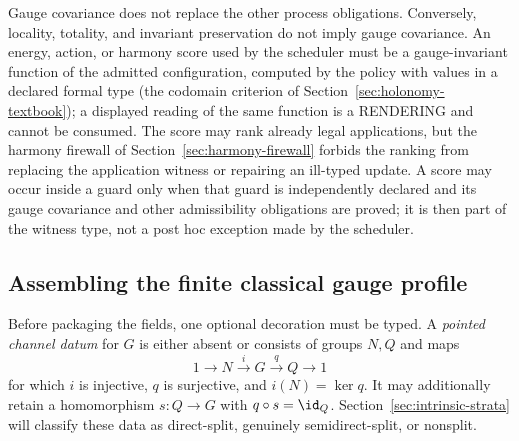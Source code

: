 Gauge covariance does not replace the other process obligations.  Conversely,
locality, totality, and invariant preservation do not imply gauge covariance.
An energy, action, or harmony score used by the scheduler must be a
gauge-invariant function of the admitted configuration, computed by the
policy with values in a declared formal type (the codomain criterion of
Section~\ref{sec:holonomy-textbook}); a displayed reading of the same
function is a RENDERING and cannot be consumed.  The score may rank already
legal applications, but the harmony firewall of Section~\ref{sec:harmony-firewall} forbids the ranking
from replacing the application witness or repairing an ill-typed update.  A
score may occur inside a guard only when that guard is independently declared
and its gauge covariance and other admissibility obligations are proved; it is
then part of the witness type, not a post hoc exception made by the scheduler.

\subsection{Assembling the finite classical gauge profile}

Before packaging the fields, one optional decoration must be typed.  A
\emph{pointed channel datum} for $G$ is either absent or consists of groups
$N,Q$ and maps
\[
 1\longrightarrow N\xrightarrow{i}G\xrightarrow{q}Q\longrightarrow1
\]
for which $i$ is injective, $q$ is surjective, and
$i(N)=\ker q$.  It may additionally retain a homomorphism
$s:Q\to G$ with $q\circ s=\id_Q$.  Section~\ref{sec:intrinsic-strata} will
classify these data as direct-split, genuinely semidirect-split, or nonsplit.

